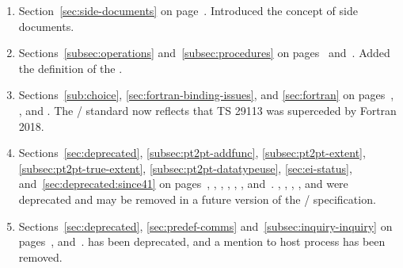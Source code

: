 \begin{enumerate}


\item
  Section~\ref{sec:side-documents} on page~\pageref{sec:side-documents}.
  \newline
  Introduced the concept of side documents.

\item
  Sections~\ref{subsec:operations} and~\ref{subsec:procedures} on pages~\pageref{subsec:operations} and~\pageref{subsec:procedures}.
  \newline
  Added the definition of the
  .

\item
  Sections~\ref{sub:choice}, \ref{sec:fortran-binding-issues}, and \ref{sec:fortran}
  on pages~\pageref{sub:choice}, \pageref{sec:fortran-binding-issues}, and \pageref{sec:fortran}.
  \newline
  The \MPI/ standard now reflects that TS 29113
  was superceded by Fortran 2018.

\item
    Sections~\ref{sec:deprecated}, \ref{subsec:pt2pt-addfunc}, \ref{subsec:pt2pt-extent}, \ref{subsec:pt2pt-true-extent}, \ref{subsec:pt2pt-datatypeuse}, \ref{sec:ei-status},
    and~\ref{sec:deprecated:since41}
    on pages~\pageref{sec:deprecated}, \pageref{subsec:pt2pt-addfunc}, \pageref{subsec:pt2pt-extent}, \pageref{subsec:pt2pt-true-extent}, \pageref{subsec:pt2pt-datatypeuse}, \pageref{sec:ei-status},
    and~\pageref{sec:deprecated:since41}.
    \newline
    , ,
    \newline
    , , and
    \newline
    were deprecated and may be removed in a future version of the \MPI/ specification.

\item
  Sections~\ref{sec:deprecated}, \ref{sec:predef-comms} and~\ref{subsec:inquiry-inquiry} on pages~\pageref{sec:deprecated}, \pageref{sec:predef-comms} and~\pageref{subsec:inquiry-inquiry}.
  \newline
   has been deprecated, and a mention to host process has been removed.


\end{enumerate}
